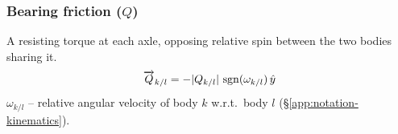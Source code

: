 \subsubsection{Bearing friction ($Q$)}
A resisting torque at each axle, opposing relative spin between the two bodies sharing it.
\begin{equation}
    \overrightarrow{Q}_{k/l} = -|Q_{k/l}|\,\operatorname{sgn}(\omega_{k/l})\,\hat{y}
\end{equation}
$\omega_{k/l}$ -- relative angular velocity of body $k$ w.r.t.\ body $l$ (\S\ref{app:notation-kinematics}).
